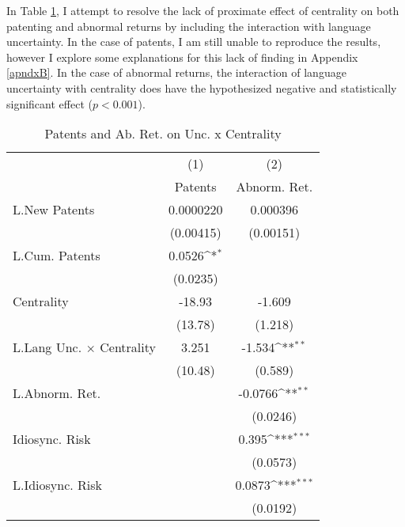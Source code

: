 In Table \ref{r7}, I attempt to resolve the lack of proximate effect of centrality on both patenting and abnormal returns by including the interaction with language uncertainty. In the case of patents, I am still unable to reproduce the results, however I explore some explanations for this lack of finding in Appendix \ref{apndxB}. In the case of abnormal returns, the interaction of language uncertainty with centrality does have the hypothesized negative and statistically significant effect ($p<0.001$).

\begin{table}[htbp]\centering \caption[Regression of Patents and Ab. Ret. on Unc. x Centrality]{Patents and Ab. Ret. on Unc. x Centrality\label{r7}}
{
\def\sym#1{\ifmmode^{#1}\else\(^{#1}\)\fi}
\begin{tabular}{l*{2}{c}}
\hline\hline
                    &\multicolumn{1}{c}{(1)}&\multicolumn{1}{c}{(2)}\\
                    &\multicolumn{1}{c}{Patents}&\multicolumn{1}{c}{Abnorm. Ret.}\\
\hline
L.New Patents       &   0.0000220         &    0.000396         \\
                    &   (0.00415)         &   (0.00151)         \\
L.Cum. Patents      &      0.0526\sym{*}  &                     \\
                    &    (0.0235)         &                     \\
Centrality          &      -18.93         &      -1.609         \\
                    &     (13.78)         &     (1.218)         \\
L.Lang Unc. $\times$ Centrality&       3.251         &      -1.534\sym{**} \\
                    &     (10.48)         &     (0.589)         \\
L.Abnorm. Ret.      &                     &     -0.0766\sym{**} \\
                    &                     &    (0.0246)         \\
Idiosync. Risk      &                     &       0.395\sym{***}\\
                    &                     &    (0.0573)         \\
L.Idiosync. Risk    &                     &      0.0873\sym{***}\\
                    &                     &    (0.0192)         \\

\end{tabular}}
\end{table}
